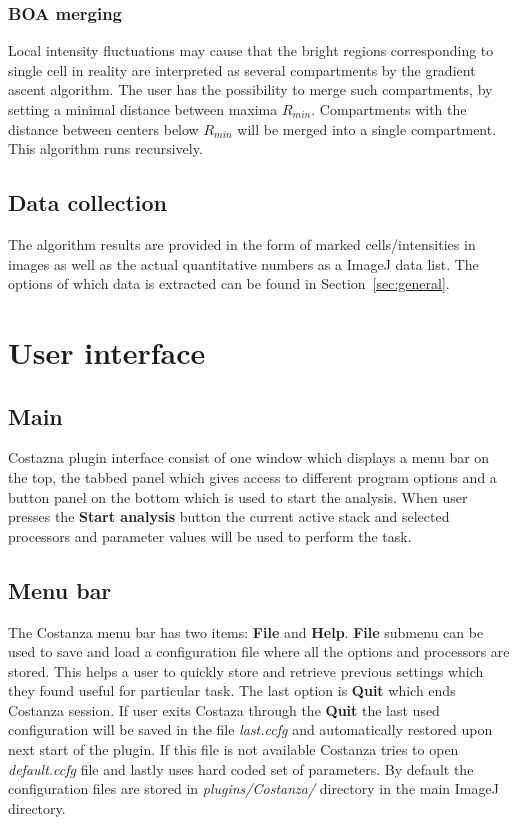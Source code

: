 \documentclass[a4paper,12pt]{article}
\begin{document}
\subsubsection{BOA merging}
Local intensity fluctuations may cause that the bright regions corresponding
to single cell in reality are interpreted as several compartments by the
gradient ascent algorithm. The user has the possibility to merge such
compartments, by setting a minimal distance between maxima
$R_{min}$. Compartments with the distance between centers below $R_{min}$ will
be merged into a single compartment. This algorithm runs recursively.

\subsection{Data collection}

The algorithm results are provided in the form of marked cells/intensities in
images as well as the actual quantitative numbers as a ImageJ data list. The
options of which data is extracted can be found in Section~\ref{sec:general}.

\section{User interface}

\subsection{Main}
Costazna plugin interface consist of one window which displays a menu bar on the
top, the tabbed panel which gives access to different program options and
a button panel on the bottom which is used to start the analysis. When user
presses the \textbf{Start analysis} button the current active stack and
selected processors and parameter values will be used to perform the task.
 
\subsection{Menu bar}
The Costanza menu bar has two items: \textbf{File} and
\textbf{Help}. \textbf{File} submenu can be used to save and load a
configuration file where all the options and processors are stored. This helps
a user to quickly store and retrieve previous settings which they found useful
for particular task. The last option is \textbf{Quit} which ends Costanza
session. If user exits Costaza through the \textbf{Quit} the last used
configuration will be saved in the file \textit{last.ccfg} and automatically
restored upon next start of the plugin. If this file is not available Costanza
tries to open \textit{default.ccfg} file and lastly uses hard coded set of
parameters. By default the configuration files are stored in
\textit{plugins/Costanza/} directory in the main ImageJ directory.
 
\end{document}
